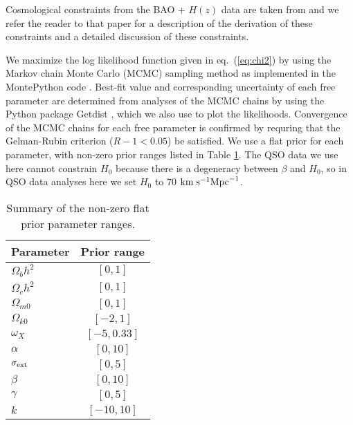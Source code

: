 \documentclass[a4paper,fleqn,usenatbib]{mnras}
\begin{document}
Cosmological constraints from the BAO + $H(z)$ data are taken from \cite{KhadkaRatra2021a} and we refer the reader to that paper for a description of the derivation of these constraints and a detailed discussion of these constraints.

We maximize the log likelihood function given in eq.\ (\ref{eq:chi2}) by using the Markov chain Monte Carlo (MCMC) sampling method as implemented in the {\sc MontePython} code \citep{Brinckmann2019}. Best-fit value and corresponding uncertainty of each free parameter are determined from analyses of the MCMC chains by using the {\sc Python} package {\sc Getdist} \citep{Lewis_2019}, which we also use to plot the likelihoods. Convergence of the MCMC chains for each free parameter is confirmed by requring that the Gelman-Rubin criterion ($R - 1 < 0.05$) be satisfied. We use a flat prior for each parameter, with non-zero prior ranges listed in Table \ref{tab:prior}. The QSO data we use here cannot constrain $H_0$ because there is a degeneracy between $\beta$ and $H_0$, so in QSO data analyses here we set $H_0$ to $70$ ${\rm km}\hspace{1mm}{\rm s}^{-1}{\rm Mpc}^{-1}$.

\begin{table}
	\centering
	\caption{Summary of the non-zero flat prior parameter ranges.}
	\label{tab:prior}
	\begin{threeparttable}
	\begin{tabular}{l|c}
	\hline
	Parameter & Prior range \\
	\hline
	$\Omega_bh^2$ & $[0, 1]$ \\
	$\Omega_ch^2$ & $[0, 1]$ \\
    $\Omega_{m0}$ & $[0, 1]$ \\
    $\Omega_{k0}$ & $[-2, 1]$ \\
    $\omega_{X}$ & $[-5, 0.33]$ \\
    $\alpha$ & $[0, 10]$ \\
    $\sigma_{\rm ext}$ & $[0, 5]$ \\
    $\beta$ & $[0, 10]$ \\
    $\gamma$ & $[0, 5]$ \\
    $k$ & $[-10, 10]$ \\
	\hline
	\end{tabular}
    \end{threeparttable}
\end{table}
\end{document}
